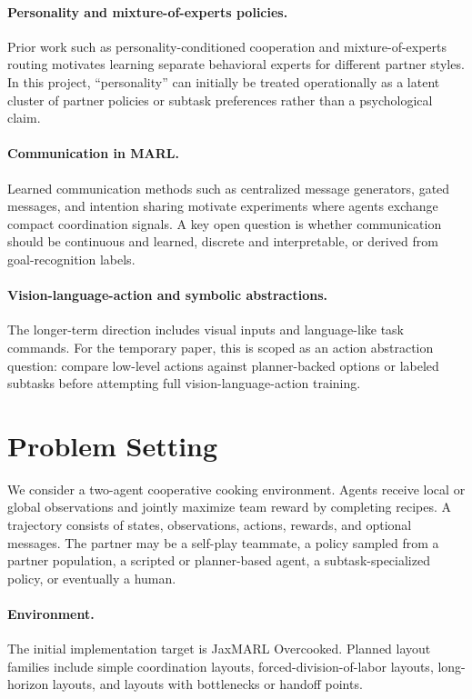 \documentclass[letterpaper]{article} %
\begin{document}
\paragraph{Personality and mixture-of-experts policies.}
Prior work such as personality-conditioned cooperation and mixture-of-experts routing motivates learning separate behavioral experts for different partner styles. In this project, ``personality'' can initially be treated operationally as a latent cluster of partner policies or subtask preferences rather than a psychological claim.

\paragraph{Communication in MARL.}
Learned communication methods such as centralized message generators, gated messages, and intention sharing motivate experiments where agents exchange compact coordination signals. A key open question is whether communication should be continuous and learned, discrete and interpretable, or derived from goal-recognition labels.

\paragraph{Vision-language-action and symbolic abstractions.}
The longer-term direction includes visual inputs and language-like task commands. For the temporary paper, this is scoped as an action abstraction question: compare low-level actions against planner-backed options or labeled subtasks before attempting full vision-language-action training.

\section{Problem Setting}

We consider a two-agent cooperative cooking environment. Agents receive local or global observations and jointly maximize team reward by completing recipes. A trajectory consists of states, observations, actions, rewards, and optional messages. The partner may be a self-play teammate, a policy sampled from a partner population, a scripted or planner-based agent, a subtask-specialized policy, or eventually a human.

\paragraph{Environment.}
The initial implementation target is JaxMARL Overcooked. Planned layout families include simple coordination layouts, forced-division-of-labor layouts, long-horizon layouts, and layouts with bottlenecks or handoff points.
\end{document}
